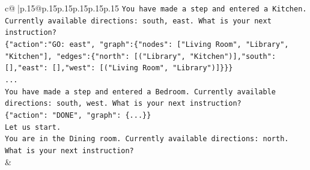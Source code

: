 \documentclass{article}
\begin{document}
{\begin{supertabular}{c@{$\;$}|p{.15\linewidth}@{}p{.15\linewidth}p{.15\linewidth}p{.15\linewidth}p{.15\linewidth}p{.15\linewidth}}
{{{\texttt{You have made a step and entered a Kitchen. Currently available directions: south, east. What is your next instruction?} \\
\texttt{\{"action":"GO: east", "graph":\{"nodes": {[}"Living Room", "Library", "Kitchen"{]}, "edges":\{"north": {[}("Library", "Kitchen"){]},"south": {[}{]},"east": {[}{]},"west": {[}("Living Room", "Library"){]}\}\}\}} \\
\texttt{...} \\
\texttt{You have made a step and entered a Bedroom. Currently available directions: south, west. What is your next instruction?} \\
\texttt{\{"action": "DONE", "graph": \{...\}\}} \\
\texttt{Let us start.} \\
\texttt{You are in the Dining room. Currently available directions: north. What is your next instruction?} \\
            }
        }
    }
    & \\ \\


\end{supertabular}}
\end{document}
